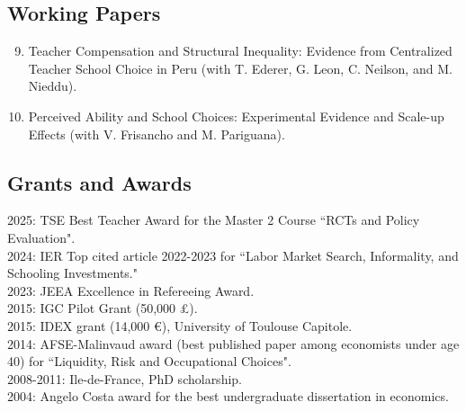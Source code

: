 \documentclass[12pt,english]{article}
\begin{document}
\subsection*{Working Papers}
\begin{enumerate}
\setcounter{enumi}{8}


\item Teacher Compensation and Structural Inequality: Evidence from Centralized Teacher School Choice in Peru (with T. Ederer, G. Leon, C. Neilson, and M. Nieddu).
\item Perceived Ability and School Choices: Experimental Evidence and Scale-up Effects (with V. Frisancho and M. Pariguana).  


\end{enumerate}

\subsection*{Grants and Awards}
2025: TSE Best Teacher Award for the Master 2 Course ``RCTs and Policy Evaluation".\vspace{0.2cm} \\
2024: IER Top cited article 2022-2023 for ``Labor Market Search, Informality, and Schooling Investments."\vspace{0.2cm} \\
2023: JEEA Excellence in Refereeing Award.\vspace{0.2cm} \\
2015: IGC Pilot Grant (50,000 \pounds). \vspace{0.2cm} \\
2015: IDEX grant (14,000 \euro), University of Toulouse Capitole. \vspace{0.2cm} \\
2014: AFSE-Malinvaud award (best published paper among economists under age 40) for ``Liquidity, Risk and Occupational Choices". \vspace{0.2cm}\\
2008-2011: Ile-de-France, PhD scholarship. \vspace{0.2cm}\\
2004: Angelo Costa award for the best undergraduate dissertation in economics. 
\end{document}
